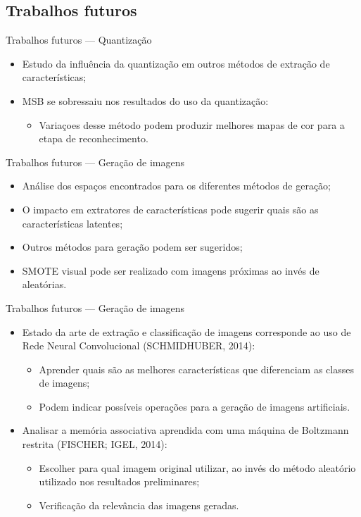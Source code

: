 \documentclass{beamer}
\begin{document}
\subsection{Trabalhos futuros}
\begin{frame}{Trabalhos futuros --- Quantização}
  \setlength\leftmargini{1em}
  \justifying
  \begin{itemize}
    \item Estudo da influência da quantização em outros métodos de extração de características;
    \item MSB se sobressaiu nos resultados do uso da quantização:
    \begin{itemize}
      \item Variaçoes desse método podem produzir melhores mapas de cor para a etapa de reconhecimento.
    \end{itemize}
  \end{itemize}
\end{frame}
\begin{frame}{Trabalhos futuros --- Geração de imagens}
  \setlength\leftmargini{1em}
  \justifying
  \begin{itemize}
  \item Análise dos espaços encontrados para os diferentes métodos de geração;
  \item O impacto em extratores de características pode sugerir quais são as características latentes;
  \item Outros métodos para geração podem ser sugeridos;
  \item SMOTE visual pode ser realizado com imagens próximas ao invés de aleatórias.
 \end{itemize}
\end{frame}
\begin{frame}{Trabalhos futuros --- Geração de imagens}
  \setlength\leftmargini{1em}
  \justifying
  \begin{itemize}
  \item Estado da arte de extração e classificação de imagens corresponde ao uso de Rede Neural Convolucional (SCHMIDHUBER, 2014):
    \begin{itemize}
    \item Aprender quais são as melhores características que diferenciam as classes de imagens;
    \item Podem indicar possíveis operações para a geração de imagens artificiais.
    \end{itemize}
  \item Analisar a memória associativa aprendida com uma máquina de Boltzmann restrita (FISCHER; IGEL, 2014):
    \begin{itemize}
    \item Escolher para qual imagem original utilizar, ao invés do método aleatório utilizado nos resultados preliminares;
    \item Verificação da relevância das imagens geradas.
    \end{itemize}
  \end{itemize}
\end{frame}
\end{document}
